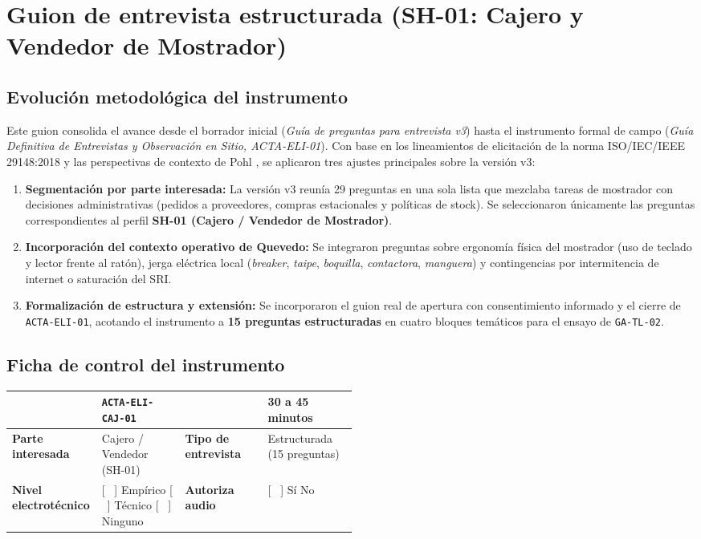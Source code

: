 \section{Guion de entrevista estructurada (SH-01: Cajero y Vendedor de Mostrador)}

\subsection{Evoluci\'on metodol\'ogica del instrumento}
Este guion consolida el avance desde el borrador inicial (\emph{Gu\'ia de preguntas para entrevista v3}) hasta el instrumento formal de campo (\emph{Gu\'ia Definitiva de Entrevistas y Observaci\'on en Sitio, ACTA-ELI-01}). Con base en los lineamientos de elicitaci\'on de la norma ISO/IEC/IEEE 29148:2018 \cite{iso29148} y las perspectivas de contexto de Pohl \cite{pohl2025}, se aplicaron tres ajustes principales sobre la versi\'on v3:

\begin{enumerate}[leftmargin=18pt,itemsep=2pt]
    \item \textbf{Segmentaci\'on por parte interesada:} La versi\'on v3 reun\'ia 29 preguntas en una sola lista que mezclaba tareas de mostrador con decisiones administrativas (pedidos a proveedores, compras estacionales y pol\'iticas de stock). Se seleccionaron \'unicamente las preguntas correspondientes al perfil \textbf{SH-01 (Cajero / Vendedor de Mostrador)}.
    \item \textbf{Incorporaci\'on del contexto operativo de Quevedo:} Se integraron preguntas sobre ergonom\'ia f\'isica del mostrador (uso de teclado y lector frente al rat\'on), jerga el\'ectrica local (\emph{breaker}, \emph{taipe}, \emph{boquilla}, \emph{contactora}, \emph{manguera}) y contingencias por intermitencia de internet o saturaci\'on del SRI.
    \item \textbf{Formalizaci\'on de estructura y extensi\'on:} Se incorporaron el guion real de apertura con consentimiento informado y el cierre de \texttt{ACTA-ELI-01}, acotando el instrumento a \textbf{15 preguntas estructuradas} en cuatro bloques tem\'aticos para el ensayo de \texttt{GA-TL-02}.
\end{enumerate}

\subsection{Ficha de control del instrumento}
\noindent\begin{tabularx}{\linewidth}{|p{0.26\linewidth}|Y|p{0.24\linewidth}|Y|}
\hline
{} & \texttt{ACTA-ELI-CAJ-01} &  & 30 a 45 minutos\\
\hline
\textbf{Parte interesada} & Cajero / Vendedor (SH-01) & \textbf{Tipo de entrevista} & Estructurada (15 preguntas)\\
\hline
{} \textbf{Nivel electrot\'ecnico} & [ \ ] Emp\'irico [ \ ] T\'ecnico [ \ ] Ninguno & \textbf{Autoriza audio} & [ \ ] S\'i \quad [ \ ] No\\
\hline
\end{tabularx}


